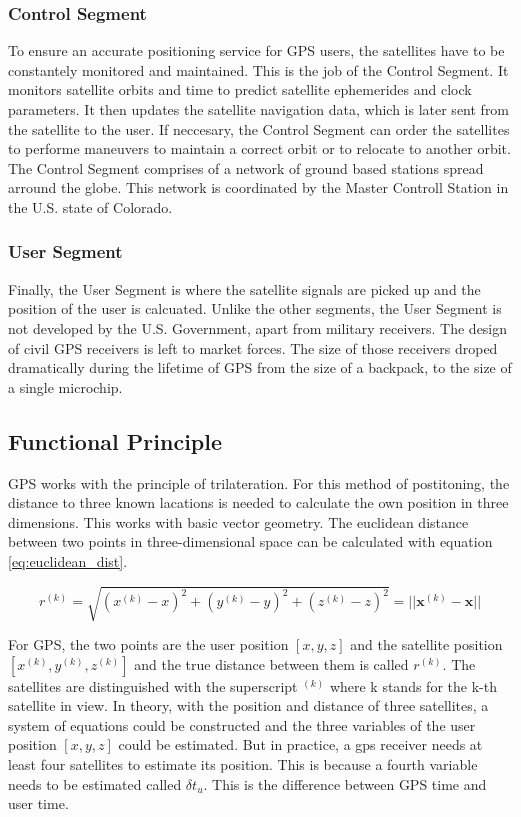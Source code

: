 \subsubsection{Control Segment}

To ensure an accurate positioning service for GPS users, the satellites have to be constantely monitored and maintained.
This is the job of the Control Segment.
It monitors satellite orbits and time to predict satellite ephemerides and clock parameters.
It then updates the satellite navigation data, which is later sent from the satellite to the user.
If neccesary, the Control Segment can order the satellites to performe maneuvers to maintain a correct orbit or to relocate to another orbit.
The Control Segment comprises of a network of ground based stations spread arround the globe.
This network is coordinated by the Master Controll Station in the U.S. state of Colorado.

\subsubsection{User Segment}

Finally, the User Segment is where the satellite signals are picked up and the position of the user is calcuated.
Unlike the other segments, the User Segment is not developed by the U.S. Government, apart from military receivers.
The design of civil GPS receivers is left to market forces.
The size of those receivers droped dramatically during the lifetime of GPS from the size of a backpack, to the size of a single microchip.


\subsection{Functional Principle}

GPS works with the principle of trilateration.
For this method of postitoning, the distance to three known lacations is needed to calculate the own position in three dimensions.
This works with basic vector geometry.
The euclidean distance between two points in three-dimensional space can be calculated with equation \ref{eq:euclidean_dist}.

\begin{equation}
 r^{(k)} = \sqrt{(x^{(k)} - x)^2 + (y^{(k)} - y)^2 + (z^{(k)} - z)^2} = \lvert\lvert \textbf{x}^{(k)} - \textbf{x} \rvert\rvert		\label{eq:euclidean_dist}
\end{equation}

For GPS, the two points are the user position $[x, y, z]$ and the satellite position $[x^{(k)}, y^{(k)}, z^{(k)}]$ and the true distance between them is called $r^{(k)}$.
The satellites are distinguished with the superscript $^{(k)}$ where k stands for the k-th satellite in view.
In theory, with the position and distance of three satellites, a system of equations could be constructed and the three variables of the user position $[x, y, z]$ could be estimated.
But in practice, a gps receiver needs at least four satellites to estimate its position.
This is because a fourth variable needs to be estimated called $\delta t_u$.
This is the difference between GPS time and user time.

